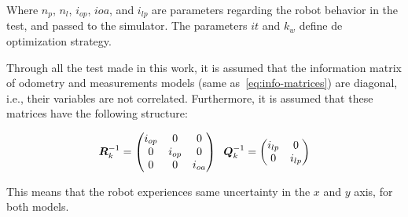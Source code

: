 Where $n_p$, $n_l$, $i_{op}$, $i{oa}$, and $i_{lp}$ are parameters regarding the robot behavior in the test, and passed to the simulator. The parameters $it$ and $k_w$ define de optimization strategy.

Through all the test made in this work, it is assumed that the information matrix of odometry and measurements models (same as~\eqref{eq:info-matrices}) are diagonal, i.e., their variables are not correlated. Furthermore, it is assumed that these matrices have the following structure:

\begin{equation}
\boldsymbol{R}^{-1}_k = \begin{pmatrix}
i_{op} & 0 & 0\\
0 & i_{op} & 0\\
0 & 0 & i_{oa}
\end{pmatrix} \;\;
\boldsymbol{Q}^{-1}_k = \begin{pmatrix}
i_{lp} & 0\\
0 & i_{lp}
\end{pmatrix} 
\label{eq:info-matrices-tests}
\end{equation}

This means that the robot experiences same uncertainty in the $x$ and $y$ axis, for both models. 

